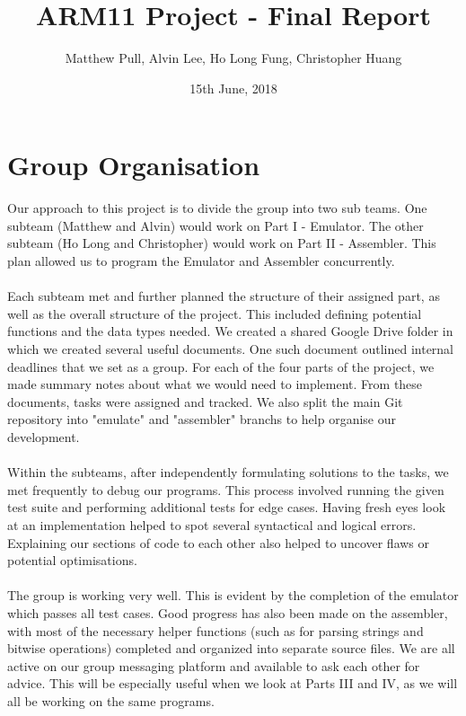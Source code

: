 \documentclass[11pt,twoside]{article}
\title{ARM11 Project - Final Report}
\date{15th June, 2018}
\author{Matthew Pull, Alvin Lee, Ho Long Fung, Christopher Huang}
\begin{document}
\maketitle



\section{Group Organisation}
Our approach to this project is to divide the group into two sub teams. One subteam (Matthew and Alvin) would work on Part I - Emulator. The other subteam (Ho Long and Christopher) would work on Part II - Assembler. This plan allowed us to program the Emulator and Assembler concurrently.
\\\\
Each subteam met and further planned the structure of their assigned part, as well as the overall structure of the project. This included defining potential functions and the data types needed. We created a shared Google Drive folder in which we created several useful documents. One such document outlined internal deadlines that we set as a group. For each of the four parts of the project, we made summary notes about what we would need to implement. From these documents, tasks were assigned and tracked. We also split the main Git repository into "emulate" and "assembler" branchs to help organise our development.
\\\\
Within the subteams, after independently formulating solutions to the tasks, we met frequently to debug our programs. This process involved running the given test suite and performing additional tests for edge cases. Having fresh eyes look at an implementation helped to spot several syntactical and logical errors. Explaining our sections of code to each other also helped to uncover flaws or potential optimisations.  
\\\\
The group is working very well. This is evident by the completion of the emulator which passes all test cases. Good progress has also been made on the assembler, with most of the necessary helper functions (such as for parsing strings and bitwise operations) completed and organized into separate source files. We are all active on our group messaging platform and available to ask each other for advice. This will be especially useful when we look at Parts III and IV, as we will all be working on the same programs. 
\end{document}
